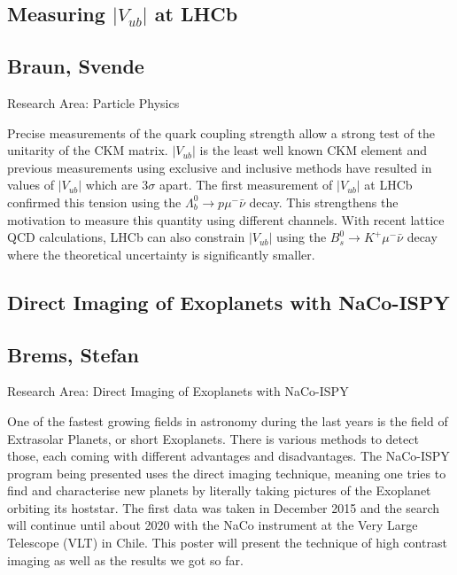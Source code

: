 \subsection*{\centering \large Measuring $|V_{ub}|$ at LHCb}
\subsection*{\centering \normalsize Braun, Svende}
Research Area: Particle Physics \newline

\noindent Precise measurements of the quark coupling strength allow a strong test of the unitarity of the CKM matrix. $|V_{ub}|$ is the least well known CKM element and previous measurements using exclusive and inclusive methods have resulted in values of $|V_{ub}|$ which are 3$\sigma$ apart. The first measurement of $|V_{ub}|$ at LHCb confirmed this tension using the $\Lambda^0_b \rightarrow p \mu^- \bar{\nu}$ decay. This strengthens the motivation to measure this quantity using different channels. With recent lattice QCD calculations, LHCb can also constrain $|V_{ub}|$ using the $B^0_s\rightarrow K^+ \mu^- \bar{\nu}$ decay where the theoretical uncertainty is significantly smaller.

\newpage
\subsection*{\centering \large Direct Imaging of Exoplanets with NaCo-ISPY}
\subsection*{\centering \normalsize Brems, Stefan}
Research Area: Direct Imaging of Exoplanets with NaCo-ISPY\newline

\noindent One of the fastest growing fields in astronomy during the last years is the field of Extrasolar Planets, or short Exoplanets. There is various methods to detect those, each coming with different advantages and disadvantages. The NaCo-ISPY program being presented uses the direct imaging technique, meaning one tries to find and characterise new planets by literally taking pictures of the Exoplanet orbiting its hoststar. The first data was taken in December 2015 and the search will continue until about 2020 with the NaCo instrument at the Very Large Telescope (VLT) in Chile. This poster will present the technique of high contrast imaging as well as the results we got so far.


